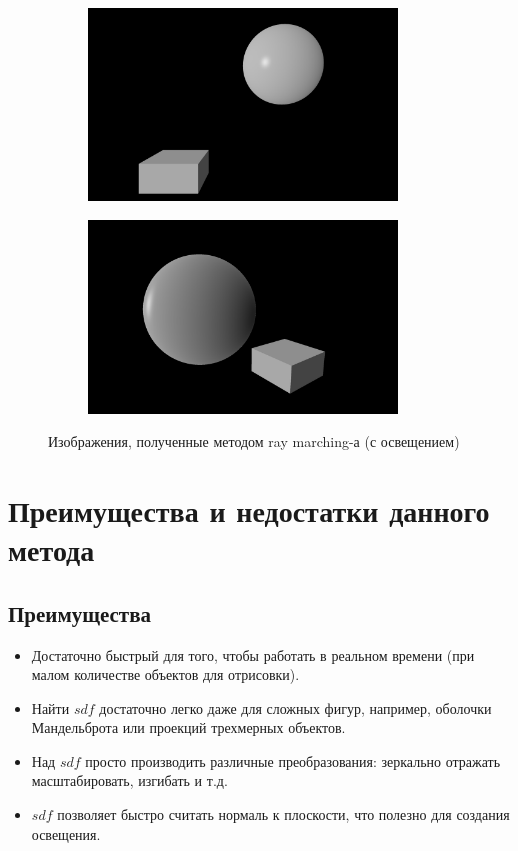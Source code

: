 \documentclass[12pt,a4paper]{article}
\begin{document}
\begin{figure}[H]
    \centering
    \begin{subfigure}{0.5\textwidth}
        \includegraphics[width=0.9\textwidth]{with_light_screenshot}
    \end{subfigure}%
    \begin{subfigure}{0.5\textwidth}
        \includegraphics[width=0.9\textwidth]{with_light_screenshot2}
    \end{subfigure}
    \caption{Изображения, полученные методом ray marching-а (с освещением)}
    \label{img:with_light}
\end{figure}


\section{Преимущества и недостатки данного метода}
\subsection{Преимущества}
\begin{itemize}
    \item Достаточно быстрый для того, чтобы работать в реальном времени (при
        малом количестве объектов для отрисовки).
    \item Найти $sdf$ достаточно легко даже для сложных фигур, например,
        оболочки Мандельброта или проекций трехмерных объектов.
    \item Над $sdf$ просто производить различные преобразования: зеркально отражать
        масштабировать, изгибать и т.д.
    \item $sdf$ позволяет быстро считать нормаль к плоскости, что полезно для
        создания освещения.
\end{itemize}
\end{document}
